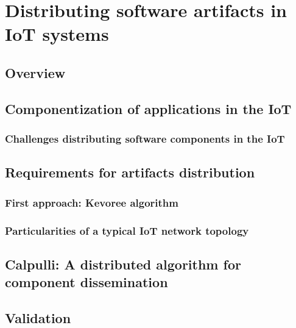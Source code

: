 \chapter{Distributing software artifacts in IoT systems}
\label{sec:Calpulli}

\section{Overview}

\section{Componentization of applications in the IoT}

\subsection{Challenges distributing software components in the IoT}

\section{Requirements for artifacts distribution}

\subsection{First approach: Kevoree algorithm}

\subsection{Particularities of a typical IoT network topology}

\section{Calpulli: A distributed algorithm for component dissemination}

\section{Validation}